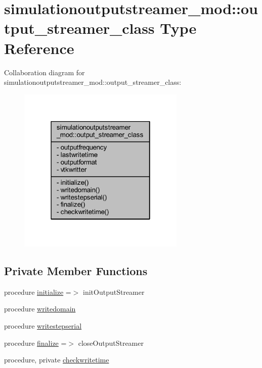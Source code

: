 \hypertarget{structsimulationoutputstreamer__mod_1_1output__streamer__class}{}\section{simulationoutputstreamer\+\_\+mod\+:\+:output\+\_\+streamer\+\_\+class Type Reference}
\label{structsimulationoutputstreamer__mod_1_1output__streamer__class}


Collaboration diagram for simulationoutputstreamer\+\_\+mod\+:\+:output\+\_\+streamer\+\_\+class\+:\nopagebreak
\begin{figure}[H]
\begin{center}
\leavevmode
\includegraphics[width=226pt]{structsimulationoutputstreamer__mod_1_1output__streamer__class__coll__graph}
\end{center}
\end{figure}
\subsection*{Private Member Functions}
\begin{DoxyCompactItemize}
\item 
procedure \mbox{\hyperlink{structsimulationoutputstreamer__mod_1_1output__streamer__class_aef05ba910aa8ebe5567fae9d59989dd1}{initialize}} =$>$ init\+Output\+Streamer
\item 
procedure \mbox{\hyperlink{structsimulationoutputstreamer__mod_1_1output__streamer__class_a4013e6853675f44c7df2409114da35d2}{writedomain}}
\item 
procedure \mbox{\hyperlink{structsimulationoutputstreamer__mod_1_1output__streamer__class_a815312dcf6d6933e5fe01a6a19c078ed}{writestepserial}}
\item 
procedure \mbox{\hyperlink{structsimulationoutputstreamer__mod_1_1output__streamer__class_a3c178b135b90289720d9cb549fa8dce2}{finalize}} =$>$ close\+Output\+Streamer
\item 
procedure, private \mbox{\hyperlink{structsimulationoutputstreamer__mod_1_1output__streamer__class_a2085a877c0b95c662c0012d911e34c58}{checkwritetime}}
\end{DoxyCompactItemize}
